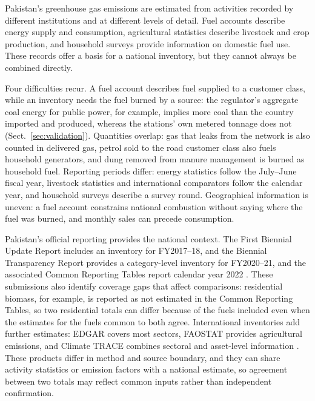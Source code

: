 \documentclass[essd,manuscript]{copernicus}
\begin{document}
\introduction
\label{sec:introduction}

Pakistan's greenhouse gas emissions are estimated from activities recorded by different institutions and at different levels of detail. Fuel accounts describe energy supply and consumption, agricultural statistics describe livestock and crop production, and household surveys provide information on domestic fuel use. These records offer a basis for a national inventory, but they cannot always be combined directly.

Four difficulties recur. A fuel account describes fuel supplied to a customer class, while an inventory needs the fuel burned by a source: the regulator's aggregate coal energy for public power, for example, implies more coal than the country imported and produced, whereas the stations' own metered tonnage does not (Sect.~\ref{sec:validation}). Quantities overlap: gas that leaks from the network is also counted in delivered gas, petrol sold to the road customer class also fuels household generators, and dung removed from manure management is burned as household fuel. Reporting periods differ: energy statistics follow the July--June fiscal year, livestock statistics and international comparators follow the calendar year, and household surveys describe a survey round. Geographical information is uneven: a fuel account constrains national combustion without saying where the fuel was burned, and monthly sales can precede consumption.

Pakistan's official reporting provides the national context. The First Biennial Update Report includes an inventory for FY2017--18, and the Biennial Transparency Report provides a category-level inventory for FY2020--21, and the associated Common Reporting Tables report calendar year 2022 \citep{PakistanBUR2022,PakistanBTR2024,PakistanCRT2026}. These submissions also identify coverage gaps that affect comparisons: residential biomass, for example, is reported as not estimated in the Common Reporting Tables, so two residential totals can differ because of the fuels included even when the estimates for the fuels common to both agree. International inventories add further estimates: EDGAR covers most sectors, FAOSTAT provides agricultural emissions, and Climate TRACE combines sectoral and asset-level information \citep{EDGAR2025,FAOSTAT2025,Tubiello2013,ClimateTRACE2026}. These products differ in method and source boundary, and they can share activity statistics or emission factors with a national estimate, so agreement between two totals may reflect common inputs rather than independent confirmation.
\end{document}
